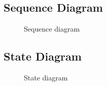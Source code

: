 \documentclass[
  english,
  a4paper,
,tablecaptionabove
]{scrartcl}
\begin{document}
\newpage

\begin{landscape}

\pagestyle{empty}

\hypertarget{sequence-diagram}{%
\section{Sequence Diagram}\label{sequence-diagram}}

\begin{figure}
    \caption{Sequence diagram} \label{fig:sequence_diagram}
\end{figure}

\end{landscape}

\newpage

\begin{landscape}

\pagestyle{empty}

\hypertarget{state-diagram}{%
\section{State Diagram}\label{state-diagram}}

\begin{figure}
    \caption{State diagram} \label{fig:state_diagram}
\end{figure}

\end{landscape}
\end{document}
